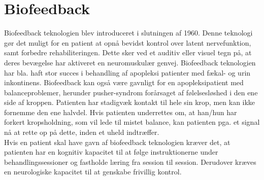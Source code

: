 
\section{Biofeedback}
Biofeedback teknologien blev introduceret i slutningen af 1960. Denne teknologi gør det muligt for en patient at opnå bevidst kontrol over latent nervefunktion, samt forbedre rehabiliteringen. Dette sker ved et auditiv eller visuel tegn på, at deres bevægelse har aktiveret en neuromuskulær genvej. Biofeedback teknologien har bla. haft stor succes i behandling af apopleksi patienter med fækal- og urin inkontinens. Biofeedback kan også være gavnligt for en apopleksipatient med balanceproblemer, herunder pusher-syndrom forårsaget af følelsesløshed i den ene side af kroppen. Patienten har stadigvæk kontakt til hele sin krop, men kan ikke fornemme den ene halvdel. Hvis patienten underrettes om, at han/hun har forkert kropsholdning, som vil lede til mistet balance, kan patienten pga. et signal nå at rette op på dette, inden et uheld indtræffer. \\ 

Hvis en patient skal have gavn af biofeedback teknologien kræver det, at patienten har en kognitiv kapacitet til at følge instruktionerne under behandlingssessioner og fastholde læring fra session til session. Derudover kræves en neurologiske kapacitet til at genskabe frivillig kontrol. \cite{Middaugh1989} \\
 
